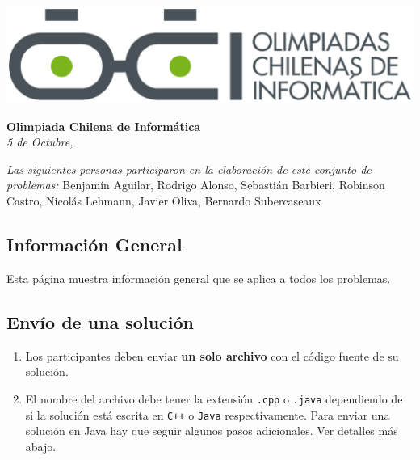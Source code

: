 \documentclass[12pt]{oci}
\begin{document}
  \begin{center}
  \includegraphics[scale=0.6]{logo.eps}

  \vskip 70pt
  \Large{\bf Olimpiada Chilena de Inform\'atica\\ \the\year}
  \vskip 10pt
  \large{\phase}
  \vskip 10pt
  \normalsize{\it 5 de Octubre, \the\year}


  \vskip 85pt


  \emph{Las siguientes personas participaron en la elaboración de este conjunto
    de problemas:}
  \vskip 10pt
  Benjamín Aguilar, Rodrigo Alonso,
  \vskip 0.5pt
  Sebastián Barbieri, Robinson Castro,
  \vskip 0.5pt
  Nicolás Lehmann, Javier Oliva,
  \vskip 0.5pt
  Bernardo Subercaseaux
\end{center} %

\cleardoublepage


\subsection*{Información General}

Esta página muestra información general que se aplica a todos los problemas.

\subsection*{Envío de una solución}

\begin{enumerate}
\item Los participantes deben enviar {\bf un solo archivo} con el código fuente de su solución.
\item El nombre del archivo debe tener la extensión \verb+.cpp+ o
  \verb+.java+ dependiendo de si la solución está escrita en
  \verb|C++| o \verb|Java| respectivamente.
Para enviar una solución en Java hay que seguir algunos pasos adicionales. Ver detalles más abajo.
\end{enumerate}
\end{document}
